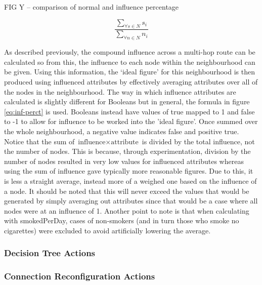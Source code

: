 \documentclass[]{report}
\begin{document}
FIG Y – comparison of normal and influence percentage

\begin{equation}
\label{eq:inf-perct}
\frac{\sum_{\forall s \in N} s_{i}}{\sum_{\forall n \in N} n_{i}}
\end{equation}

As described previously, the compound influence across a multi-hop route can be calculated so from this, the influence to each node within the neighbourhood can be given. Using this information, the `ideal figure' for this neighbourhood is then produced using influenced attributes by effectively averaging attributes over all of the nodes in the neighbourhood. The way in which influence attributes are calculated is slightly different for Booleans but in general, the formula in figure \ref{eq:inf-perct} is used. Booleans instead have values of true mapped to 1 and false to -1 to allow for influence to be worked into the 'ideal figure'. Once summed over the whole neighbourhood, a negative value indicates false and positive true. Notice that the sum of $\text{influence} \times \text{attribute}$ is divided by the total influence, not the number of nodes. This is because, through experimentation, division by the number of nodes resulted in very low values for influenced attributes whereas using the sum of influence gave typically more reasonable figures. Due to this, it is less a straight average, instead more of a weighed one based on the influence of a node. It should be noted that this will never exceed the values that would be generated by simply averaging out attributes since that would be a case where all nodes were at an influence of 1. Another point to note is that when calculating with smokedPerDay, cases of non-smokers (and in turn those who smoke no cigarettes) were excluded to avoid artificially lowering the average.

\label{sec:neighbourhood}
\subsubsection{Decision Tree Actions}
\subsubsection{Connection Reconfiguration Actions}

%
%

%
%
\end{document}
